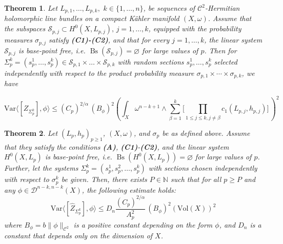 \documentclass[10pt,a4paper]{amsart}
\newtheorem{thm}{Theorem}
\begin{document}
\begin{thm} \label{genvar}
Let $L_{p, 1}, \ldots, L_{p, k}, \,\,k\in \{1, \ldots, n\}$, be sequences of $\mathscr{C}^{2}$-Hermitian holomorphic line bundles on a compact K\"{a}hler manifold $(X, \omega)$. Assume that the subspaces $\mathcal{S}_{p, j} \subset H^{0}(X, L_{p, j}),\,j=1,\ldots, k$, equipped with the probability measures $\sigma_{p, j}$ satisfy \textbf{(C1)-(C2)}, and that for every $j=1,\ldots,k$,
the linear system $\mathcal{S}_{p,j}$ is base-point free, i.e. $\operatorname{Bs}(\mathcal{S}_{p,j})=\varnothing$ for large values of $p$. Then for $\Sigma^{k}_{p}=(s_{p}^{1}, \ldots, s_{p}^{k})\in \mathcal{S}_{p, 1} \times \ldots \times \mathcal{S}_{p, k}$ with random sections $s_{p}^{1}, \ldots, s_{p}^{k}$ selected independently with respect to the product probability measure $\sigma_{p, 1} \times \cdots \times \sigma_{p, k}$, we have

\begin{equation} \label{varra}\mathrm{Var} \langle [Z_{\Sigma_{p}^{k}}], \phi \rangle \leq (C_{p})^{2/\alpha}\,(B_{\phi})^{2}(\int_{X}{\omega^{n-k+1} \wedge \sum_{\beta=1}^{k}{\Big[ \prod_{1\leq j \leq k, j \neq \beta}{c_{1}(L_{p, j}, h_{p, j})}\Big]}\,})^{2}\end{equation}

\end{thm}

\begin{thm}\label{th1}
	Let \( (L_{p}, h_{p})_{p \geq 1} \), \( (X, \omega) \), and \( \sigma_{p} \) be as defined above. Assume that they satisfy the conditions \textbf{(A)}, \textbf{(C1)}-\textbf{(C2)},
and the linear system $H^{0}(X, L_p)$ is base-point free, i.e. $\operatorname{Bs}(H^{0}(X, L_p))=\varnothing$ for large values of $p$. Further, let the systems \( \Sigma^{k}_{p}= (s_{p}^{1}, s_{p}^{2}, \ldots, s_{p}^{k}) \) with sections chosen independently with respect to \( \sigma^{k}_p \) be given. Then, there exists \( P \in \mathbb{N} \) such that for all \( p \geq P \) and any \( \phi \in \mathcal{D}^{n-k, n-k}(X) \), the following estimate holds:
	\begin{equation}\label{mainvar}
			\mathrm{Var}\langle [\widehat{Z}_{\Sigma_{p}^{k}}], \phi \rangle  \leq D_{n} \frac{(C_{p})^{2/\alpha}}{A^{2}_{p}}\,(B_{\phi})^{2}(\mathrm{Vol}(X))^{2}
			 \end{equation}where  $B_{\phi}= b \|\phi\|_{\mathscr{C}^{2}}$ is a positive constant depending on the form $\phi$, and $D_{n}$ is a constant that depends only on the dimension of $X$.
\end{thm}
\end{document}
